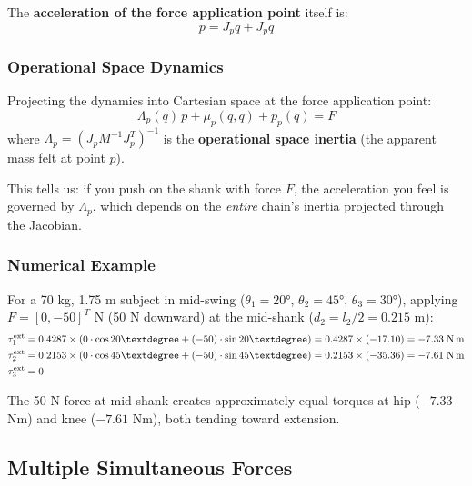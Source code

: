 \documentclass[11pt,a4paper]{article}
\newcommand{\vc}[1]{\bm{#1}}
\newcommand{\mat}[1]{\bm{#1}}
\newcommand{\dt}[1]{\dot{#1}}
\newcommand{\ddt}[1]{\ddot{#1}}
\def\vc#1{#1}%
\def\mat#1{#1}%
\def\dt#1{#1}%
\def\ddt#1{#1}%
\def\bm#1{#1}%
\begin{document}
The \textbf{acceleration of the force application point} itself is:
\begin{equation}
    \ddt{\vc{p}} = \vc{J}_p \ddt{\vc{q}} + \dt{\vc{J}}_p \dt{\vc{q}}
    \label{eq:point_accel}
\end{equation}

\subsubsection*{Operational Space Dynamics}

Projecting the dynamics into Cartesian space at the force application point:
\begin{equation}
    \vc{\Lambda}_p(\vc{q}) \, \ddt{\vc{p}} + \vc{\mu}_p(\vc{q},\dt{\vc{q}}) + \vc{p}_p(\vc{q})
    = \vc{F}
    \label{eq:operational_space}
\end{equation}
where $\vc{\Lambda}_p = (\vc{J}_p \mat{M}^{-1} \vc{J}_p^T)^{-1}$ is the
\textbf{operational space inertia} (the apparent mass felt at point $\vc{p}$).

This tells us: if you push on the shank with force $\vc{F}$, the acceleration
you feel is governed by $\vc{\Lambda}_p$, which depends on the \textit{entire}
chain's inertia projected through the Jacobian.

\subsubsection*{Numerical Example}

For a 70 kg, 1.75 m subject in mid-swing ($\theta_1 = 20°$, $\theta_2 = 45°$,
$\theta_3 = 30°$), applying $\vc{F} = [0, -50]^T$ N (50 N downward) at the
mid-shank ($d_2 = l_2/2 = 0.215$ m):
\begin{align*}
    \tau_1^{\text{ext}} &= 0.4287 \times (0 \cdot \cos 20° + (-50) \cdot \sin 20°)
                        = 0.4287 \times (-17.10) = -7.33 \;\text{N\,m} \\
    \tau_2^{\text{ext}} &= 0.2153 \times (0 \cdot \cos 45° + (-50) \cdot \sin 45°)
                        = 0.2153 \times (-35.36) = -7.61 \;\text{N\,m} \\
    \tau_3^{\text{ext}} &= 0
\end{align*}

The 50 N force at mid-shank creates approximately equal torques at hip ($-7.33$ Nm)
and knee ($-7.61$ Nm), both tending toward extension.

\subsection{Multiple Simultaneous Forces}
\end{document}
